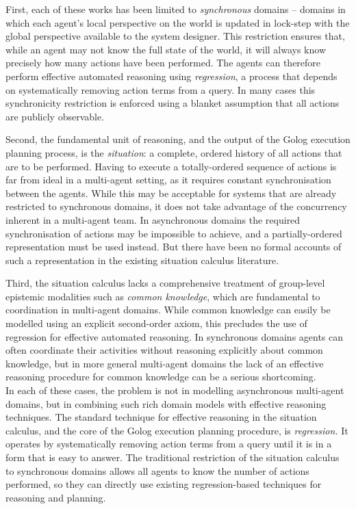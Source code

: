 First, each of these works has been limited to \emph{synchronous}
domains -- domains in which each agent's local perspective on the
world is updated in lock-step with the global perspective available
to the system designer. This restriction ensures that, while an agent
may not know the full state of the world, it will always know precisely
how many actions have been performed. The agents can therefore perform
effective automated reasoning using \emph{regression}, a process that
depends on systematically removing action terms from a query. In many
cases this synchronicity restriction is enforced using a blanket assumption
that all actions are publicly observable.

Second, the fundamental unit of reasoning, and the output of the Golog
execution planning process, is the \emph{situation}: a complete, ordered
history of all actions that are to be performed. Having to execute
a totally-ordered sequence of actions is far from ideal in a multi-agent
setting, as it requires constant synchronisation between the agents.
While this may be acceptable for systems that are already restricted
to synchronous domains, it does not take advantage of the concurrency
inherent in a multi-agent team. In asynchronous domains the required
synchronisation of actions may be impossible to achieve, and a partially-ordered
representation must be used instead. But there have been no formal
accounts of such a representation in the existing situation calculus
literature.

Third, the situation calculus lacks a comprehensive treatment of group-level
epistemic modalities such as \emph{common knowledge}, which are fundamental
to coordination in multi-agent domains. While common knowledge can
easily be modelled using an explicit second-order axiom, this precludes
the use of regression for effective automated reasoning. In synchronous
domains agents can often coordinate their activities without reasoning
explicitly about common knowledge, but in more general multi-agent
domains the lack of an effective reasoning procedure for common knowledge
can be a serious shortcoming.\\


In each of these cases, the problem is not in modelling asynchronous
multi-agent domains, but in combining such rich domain models with
effective reasoning techniques. The standard technique for effective
reasoning in the situation calculus, and the core of the Golog execution
planning procedure, is \emph{regression.} It operates by systematically
removing action terms from a query until it is in a form that is easy
to answer. The traditional restriction of the situation calculus to
synchronous domains allows all agents to know the number of actions
performed, so they can directly use existing regression-based techniques
for reasoning and planning.

